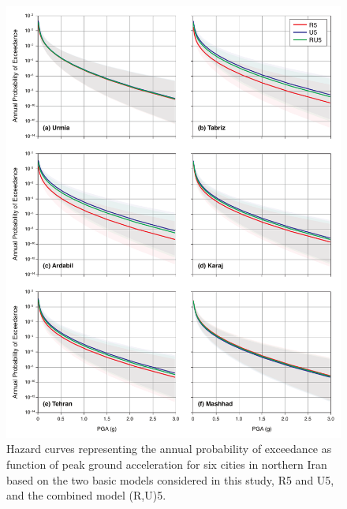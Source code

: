 \begin{figure}[th!]
    \centering
    \includegraphics[width=\textwidth]{figures/pdf/figure-11} 
    \caption{Hazard curves representing the annual probability of exceedance as function of peak ground acceleration for six cities in northern Iran based on the two basic models considered in this study, R5 and U5, and the combined model (R,U)5.}
    \label{fig:hazardcurve}
\end{figure}

